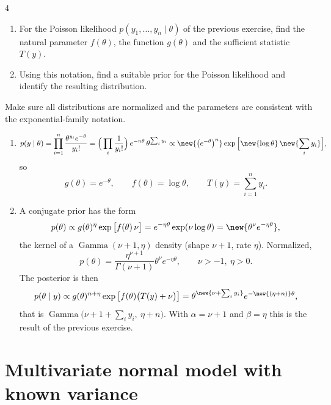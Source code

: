 \begin{homework}{4}
\begin{enumerate}[label=(\roman*)]
\item For the Poisson likelihood $p(y_1, \dots, y_n \mid \theta)$ of the previous exercise, find the natural parameter $f(\theta)$, the function $g(\theta)$ and the sufficient statistic $T(y)$.
\item Using this notation, find a suitable prior for the Poisson likelihood and identify the resulting distribution.
\end{enumerate}
Make sure all distributions are normalized and the parameters are consistent with the exponential-family notation.

\soln
\begin{enumerate}[label=(\roman*)]
\item
\[
p(y \mid \theta) = \prod_{i=1}^{n}\frac{\theta^{y_i}e^{-\theta}}{y_i!}
= \Big(\prod_i \frac{1}{y_i!}\Big)\,e^{-n\theta}\,\theta^{\sum_i y_i}
\propto \new{\big(e^{-\theta}\big)^{n}}\exp\Big[\new{\log\theta}\,\new{\sum_i y_i}\Big],
\]
so
\[
g(\theta) = e^{-\theta}, \qquad f(\theta) = \log\theta, \qquad T(y) = \sum_{i=1}^{n} y_i.
\]
\item A conjugate prior has the form
\[
p(\theta) \propto g(\theta)^{\eta}\exp\big[f(\theta)\,\nu\big] = e^{-\eta\theta}\exp(\nu\log\theta) = \new{\theta^{\nu}e^{-\eta\theta}},
\]
the kernel of a $\operatorname{Gamma}(\nu + 1, \eta)$ density (shape $\nu + 1$, rate $\eta$). Normalized,
\[
p(\theta) = \frac{\eta^{\nu+1}}{\Gamma(\nu+1)}\theta^{\nu}e^{-\eta\theta}, \qquad \nu > -1,\ \eta > 0.
\]
The posterior is then
\[
p(\theta \mid y) \propto g(\theta)^{n+\eta}\exp\big[f(\theta)\big(T(y) + \nu\big)\big] = \theta^{\new{\nu + \sum_i y_i}}e^{-\new{(\eta+n)}\theta},
\]
that is $\operatorname{Gamma}\big(\nu + 1 + \sum_i y_i,\ \eta + n\big)$. With $\alpha = \nu + 1$ and $\beta = \eta$ this is the result of the previous exercise.
\end{enumerate}
\end{homework}

\section{Multivariate normal model with known variance}
